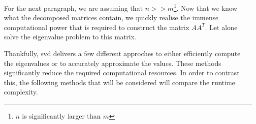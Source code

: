 For the next paragraph, we are assuming that $n>>m$\footnote{$n$ is significantly larger than $m$}.
Now that we know what the decomposed matrices contain, we quickly realise the immense computational power that is required to construct the matrix $AA^T$.
Let alone solve the eigenvalue problem to this matrix.

Thankfully, \gls{svd} delivers a few different approches to either efficiently compute the eigenvalues or to accurately approximate the values.
These methods significantly reduce the required computational resources.
In order to contrast this, the following methods that will be considered will compare the runtime complexity.



\clearpage

